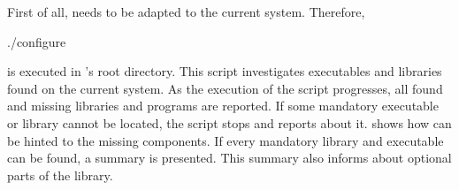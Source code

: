 %                                                                        
%                                                                        
%                                                                        
%                                                                        
%


First of all, \projectname needs to be adapted to the current system. Therefore,
\begin{console}
./configure
\end{console}
is executed in \projectname's root directory. This script investigates executables and libraries found on the current system. As the execution of the script progresses, all found and missing libraries and programs are reported. If some mandatory executable or library cannot be located, the script stops and reports about it.  shows how  can be hinted to the missing components. If every mandatory library and executable can be found, a summary is presented. This summary also informs about optional parts of the library.

